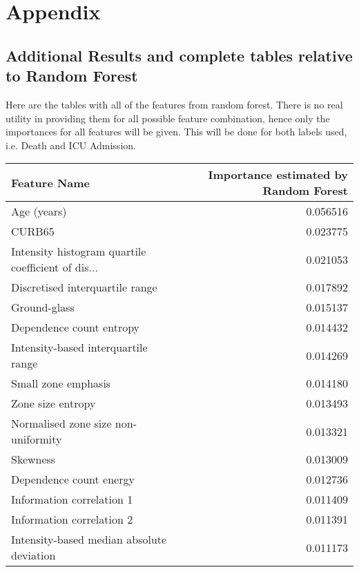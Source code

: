 \chapter{Appendix}

\section{Additional Results and complete tables relative to Random Forest}\label{sec:RFAdditional}

Here are the tables with all of the features from random forest. There is no real utility in providing them for all possible feature combination, hence only the importances for all features will be given.
This will be done for both labels used, i.e. Death and ICU Admission. 

\centering
\begin{longtable}{|lr|}
\toprule
Feature Name &  Importance estimated by Random Forest \\
\midrule
Age (years)                                        &        0.056516 \\
CURB65                                             &        0.023775 \\
Intensity histogram quartile coefficient of dis... &        0.021053 \\
Discretised interquartile range                    &        0.017892 \\
Ground-glass                                       &        0.015137 \\
Dependence count entropy                           &        0.014432 \\
Intensity-based interquartile range                &        0.014269 \\
Small zone emphasis                                &        0.014180 \\
Zone size entropy                                  &        0.013493 \\
Normalised zone size non-uniformity                &        0.013321 \\
Skewness                                           &        0.013009 \\
Dependence count energy                            &        0.012736 \\
Information correlation 1                          &        0.011409 \\
Information correlation 2                          &        0.011391 \\
Intensity-based median absolute deviation          &        0.011173 \\

\end{longtable}
